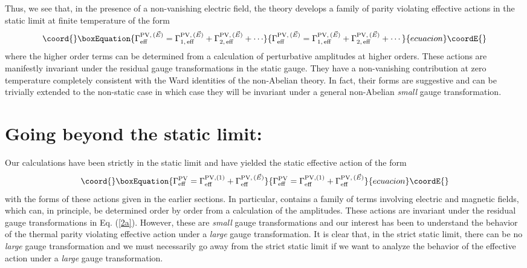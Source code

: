 \documentclass[a4paper,12pt]{article}
\begin{document}
Thus, we see that, in the presence of a non-vanishing electric field,
the theory develops a family of parity violating effective actions in
the static limit at finite temperature of the form
\begin{equation}\coord{}\boxEquation{
\Gamma_{\rm eff}^{{\rm PV},\,(\vec{E})} = \Gamma_{1,\,{\rm eff}}^{{\rm
    PV},\,(\vec{E})} + \Gamma_{2,\,{\rm eff}}^{{\rm PV},\,(\vec{E})} +
    \cdots\label{30}
}{
\Gamma_{\rm eff}^{{\rm PV},\,(\vec{E})} = \Gamma_{1,\,{\rm eff}}^{{\rm
    PV},\,(\vec{E})} + \Gamma_{2,\,{\rm eff}}^{{\rm PV},\,(\vec{E})} +
    \cdots}{ecuacion}\coordE{}\end{equation}
where the higher order terms can be determined from a calculation of
perturbative amplitudes at higher orders. These actions are manifestly
invariant under the residual gauge transformations in the static
gauge. They have a non-vanishing contribution at zero temperature
completely consistent with the Ward identities of the non-Abelian
theory. In fact, their forms are suggestive and can be trivially
extended to the non-static case in which case they will be invariant
under a general non-Abelian {\it small} gauge transformation.

\section{Going beyond the static limit:}

Our calculations have been strictly in the static limit and have
yielded the static effective action of the form
\begin{equation}\coord{}\boxEquation{
\Gamma_{\rm eff}^{\rm PV} = \Gamma_{\rm eff}^{{\rm PV}, (1)}
+ \Gamma_{\rm eff}^{{\rm PV},\,(\vec{E})}
}{
\Gamma_{\rm eff}^{\rm PV} = \Gamma_{\rm eff}^{{\rm PV}, (1)}
+ \Gamma_{\rm eff}^{{\rm PV},\,(\vec{E})}
}{ecuacion}\coordE{}\end{equation}
with the forms of these actions given in the earlier sections. In
particular, \coordHE{} contains a family
of terms involving electric and magnetic fields, which can, in
principle, be determined order by order from a calculation of the
amplitudes. These actions are invariant under the residual gauge
transformations in Eq. (\ref{2a}). However, these are {\it small}
gauge transformations and our interest has been to understand the
behavior of the thermal parity violating effective action under a {\it large}
gauge transformation. It is clear that, in the strict static limit,
there can be no {\it large} gauge transformation and we must
necessarily go away from the strict static limit if we want to analyze
the behavior of the effective action under a {\it large} gauge
transformation.
\end{document}
